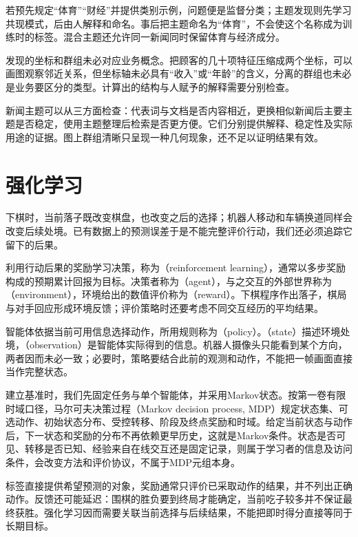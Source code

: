 若预先规定“体育”“财经”并提供类别示例，问题便是监督分类；主题发现则先学习共现模式，后由人解释和命名。事后把主题命名为“体育”，不会使这个名称成为训练时的标签。混合主题还允许同一新闻同时保留体育与经济成分。

发现的坐标和群组未必对应业务概念。把顾客的几十项特征压缩成两个坐标，可以画图观察邻近关系，但坐标轴未必具有“收入”或“年龄”的含义，分离的群组也未必是业务要区分的类型。计算出的结构与人赋予的解释需要分别检查。

新闻主题可以从三方面检查：代表词与文档是否内容相近，更换相似新闻后主要主题是否稳定，使用主题整理后检索是否更方便。它们分别提供解释、稳定性及实际用途的证据。图上群组清晰只呈现一种几何现象，还不足以证明结果有效。

\FloatBarrier
\section{强化学习}
\label{sec:reinforcement-learning}

下棋时，当前落子既改变棋盘，也改变之后的选择；机器人移动和车辆换道同样会改变后续处境。已有数据上的预测误差于是不能完整评价行动，我们还必须追踪它留下的后果。

利用行动后果的奖励学习决策，称为（reinforcement learning），通常以多步奖励构成的预期累计回报为目标。决策者称为（agent），与之交互的外部世界称为（environment），环境给出的数值评价称为（reward）。下棋程序作出落子，棋局与对手回应形成环境反馈；评价策略时还要考虑不同交互经历的平均结果。

智能体依据当前可用信息选择动作，所用规则称为（policy）。（state）描述环境处境，（observation）是智能体实际得到的信息。机器人摄像头只能看到某个方向，两者因而未必一致；必要时，策略要结合此前的观测和动作，不能把一帧画面直接当作完整状态。

建立基准时，我们先固定任务与单个智能体，并采用Markov状态。按第一卷有限时域口径，马尔可夫决策过程（Markov decision process, MDP）规定状态集、可选动作、初始状态分布、受控转移、阶段及终点奖励和时域。给定当前状态与动作后，下一状态和奖励的分布不再依赖更早历史，这就是Markov条件。状态是否可见、转移是否已知、经验来自在线交互还是固定记录，则属于学习者的信息及访问条件，会改变方法和评价协议，不属于MDP元组本身。

标签直接提供希望预测的对象，奖励通常只评价已采取动作的结果，并不列出正确动作。反馈还可能延迟：围棋的胜负要到终局才能确定，当前吃子较多并不保证最终获胜。强化学习因而需要关联当前选择与后续结果，不能把即时得分直接等同于长期目标。

